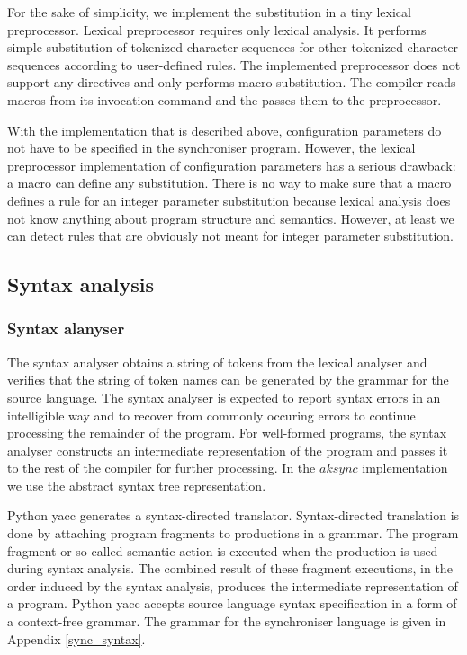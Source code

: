 For the sake of simplicity, we implement the substitution in a tiny lexical preprocessor. Lexical preprocessor requires only lexical analysis. It performs simple substitution of tokenized character sequences for other tokenized character sequences according to user-defined rules. The implemented preprocessor does not support any directives and only performs macro substitution. The compiler reads macros from its invocation command and the passes them to the preprocessor.

With the implementation that is described above, configuration parameters do not have to be specified in the synchroniser program. However, the lexical preprocessor implementation of configuration parameters has a serious drawback: a macro can define any substitution. There is no way to make sure that a macro defines a rule for an integer parameter substitution because lexical analysis does not know anything about program structure and semantics. However, at least we can detect rules that are obviously not meant for integer parameter substitution.



\subsection{Syntax analysis}
  \subsubsection{Syntax alanyser}
The syntax analyser obtains a string of tokens from the lexical analyser and verifies that the string of token names can be generated by the grammar for the source language. The syntax analyser is expected to report syntax errors in an intelligible way and to recover from commonly occuring errors to continue processing the remainder of the program. For well-formed programs, the syntax analyser constructs an intermediate representation of the program and passes it to the rest of the compiler for further processing. In the $aksync$ implementation we use the abstract syntax tree representation.

Python yacc generates a syntax-directed translator. Syntax-directed translation is done by attaching program fragments to productions in a grammar. The program fragment or so-called semantic action is executed when the production is used during syntax analysis. The combined result of these fragment executions, in the order induced by the syntax analysis, produces the intermediate representation of a program. Python yacc accepts source language syntax specification in a form of a context-free grammar. The grammar for the synchroniser language is given in Appendix \ref{sync_syntax}.

